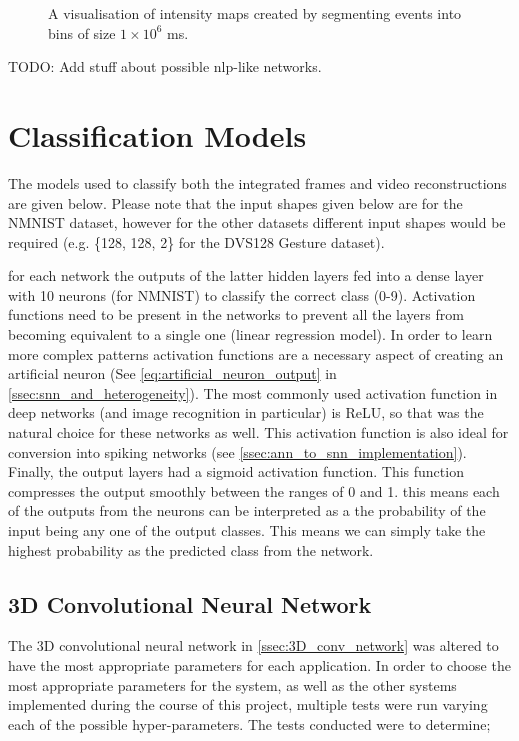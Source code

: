 \begin{figure}[htb]
    \caption{A visualisation of intensity maps created by segmenting events into bins of size $ 1 \times 10^6 $ ms.}%
    \label{fig:nmnist_spikes_to_intensity_map}%
\end{figure}

\color{red} TODO: Add stuff about possible nlp-like networks. \color{black}

\section{Classification Models}

The models used to classify both the integrated frames and video reconstructions are given below. Please note that the input shapes given below are for the NMNIST dataset, however for the other datasets different input shapes would be required (e.g. \{128, 128, 2\} for the DVS128 Gesture dataset).

for each network the outputs of the latter hidden layers fed into a dense layer with 10 neurons (for NMNIST) to classify the correct class (0-9). Activation functions need to be present in the networks to prevent all the layers from becoming equivalent to a single one (linear regression model). In order to learn more complex patterns activation functions are a necessary aspect of creating an artificial neuron (See \cref{eq:artificial_neuron_output} in \cref{ssec:snn_and_heterogeneity}). The most commonly used activation function in deep networks (and image recognition in particular) is ReLU, so that was the natural choice for these networks as well. This activation function is also ideal for conversion into spiking networks (see \cref{ssec:ann_to_snn_implementation}). Finally, the output layers had a sigmoid activation function. This function compresses the output smoothly between the ranges of 0 and 1. this means each of the outputs from the neurons can be interpreted as a the probability of the input being any one of the output classes. This means we can simply take the highest probability as the predicted class from the network.

\subsection{3D Convolutional Neural Network}

The 3D convolutional neural network in \cref{ssec:3D_conv_network} was altered to have the most appropriate parameters for each application. In order to choose the most appropriate parameters for the system, as well as the other systems implemented during the course of this project, multiple tests were run varying each of the possible hyper-parameters. The tests conducted were to determine;

